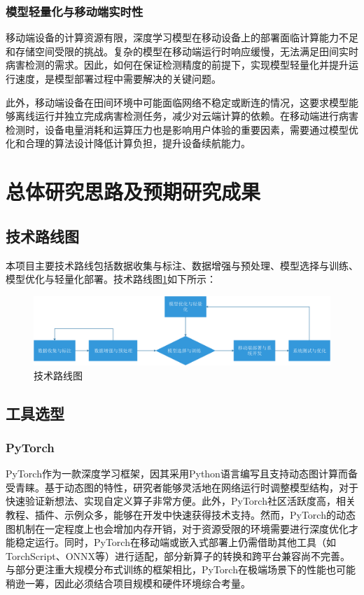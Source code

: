 \subsubsection{模型轻量化与移动端实时性}
移动端设备的计算资源有限，深度学习模型在移动设备上的部署面临计算能力不足和存储空间受限的挑战。复杂的模型在移动端运行时响应缓慢，无法满足田间实时病害检测的需求。因此，如何在保证检测精度的前提下，实现模型轻量化并提升运行速度，是模型部署过程中需要解决的关键问题。

此外，移动端设备在田间环境中可能面临网络不稳定或断连的情况，这要求模型能够离线运行并独立完成病害检测任务，减少对云端计算的依赖。在移动端进行病害检测时，设备电量消耗和运算压力也是影响用户体验的重要因素，需要通过模型优化和合理的算法设计降低计算负担，提升设备续航能力。

\section{总体研究思路及预期研究成果}
\subsection{技术路线图}
本项目主要技术路线包括数据收集与标注、数据增强与预处理、模型选择与训练、模型优化与轻量化部署。技术路线图\ref{fig:tec_road}如下所示：
\begin{figure}[H]
  \centering
  \includegraphics[width=\textwidth]{pictures/技术路线图.png}
  \caption{技术路线图}
  \label{fig:tec_road}
\end{figure}

\subsection{工具选型}
\subsubsection{PyTorch}
PyTorch作为一款深度学习框架，因其采用Python语言编写且支持动态图计算而备受青睐。基于动态图的特性，研究者能够灵活地在网络运行时调整模型结构，对于快速验证新想法、实现自定义算子非常方便。此外，PyTorch社区活跃度高，相关教程、插件、示例众多，能够在开发中快速获得技术支持。然而，PyTorch的动态图机制在一定程度上也会增加内存开销，对于资源受限的环境需要进行深度优化才能稳定运行。同时，PyTorch在移动端或嵌入式部署上仍需借助其他工具（如TorchScript、ONNX等）进行适配，部分新算子的转换和跨平台兼容尚不完善。与部分更注重大规模分布式训练的框架相比，PyTorch在极端场景下的性能也可能稍逊一筹，因此必须结合项目规模和硬件环境综合考量。

